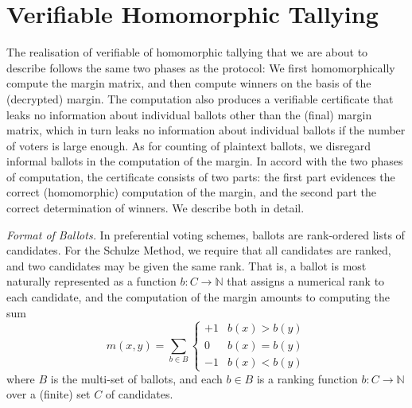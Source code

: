 \documentclass{llncs}
\newcommand{\Nat}{\mathbb{N}}
\begin{document}
\section{Verifiable Homomorphic Tallying}
The realisation of verifiable of homomorphic tallying that we are about to
describe follows the same two phases as the protocol: We first
homomorphically compute the margin matrix, and then compute
winners on the basis of the (decrypted) margin. The computation also
produces a verifiable certificate that leaks no information about
individual ballots other than the (final) margin matrix, which in
turn leaks no information about individual ballots if the number of
voters is large enough. As for counting of plaintext ballots, we
disregard informal ballots in the computation of the margin.
In accord with the two phases of computation, the certificate
consists of two parts: the first part evidences the correct
(homomorphic) computation of the margin, and the second part the
correct determination of winners. We describe both in detail.

\smallskip\noindent\emph{Format of Ballots.} In preferential voting
schemes, ballots are rank-ordered lists of candidates. For the
Schulze Method, we require that all candidates are ranked, and two
candidates may be given the same rank. That is, a ballot is most
naturally represented as a function $b: C \to \Nat$ that assigns a
numerical rank to each candidate, and the computation of the margin
amounts to computing the sum
\[ m(x, y) = \sum_{b \in B} \begin{cases} +1 & b(x) > b(y) \\ 0 &
b(x) = b(y) \\ -1 & b(x) < b(y) \end{cases} \]
where $B$ is the multi-set of ballots, and each $b \in B$ is a
ranking function $b: C \to \Nat$ over a (finite) set $C$ of
candidates. 
\end{document}
